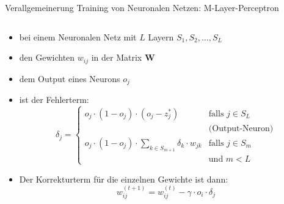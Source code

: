 \documentclass[aspectratio=1610, xcolor=dvipsnames, 9pt]{beamer}
\begin{document}
      \begin{frame}{ Verallgemeinerung Training von Neuronalen Netzen: M-Layer-Perceptron}
        \begin{columns}
          \begin{column}{1\textwidth}
            \begin{itemize}
              \item bei einem Neuronalen Netz mit $L$ Layern $S_1, S_2 , \ldots , S_L$
              \item den Gewichten $w_{ij}$ in der Matrix $\mathbf{W}$
              \item dem Output eines Neurons $o_j$
              \item ist der Fehlerterm: 
            \begin{equation*}
              \delta_j = \begin{cases} 
                o_j \cdot (1-o_j) \cdot (o_j - z_j^*) & \text{falls } j \in S_L \\
                & \text{(Output-Neuron)} \\[0.5em]
                o_j \cdot (1-o_j) \cdot \sum_{k \in S_{m+1}} \delta_k \cdot w_{jk} & \text{falls } j \in S_m \\
                & \text{und } m < L
              \end{cases}
            \end{equation*}
            \item Der Korrekturterm für die einzelnen Gewichte ist dann:
            \begin{equation}
              w_{ij}^{(t+1)} = w_{ij}^{(t)} - \gamma \cdot o_i \cdot \delta_j 
            \end{equation}
            \end{itemize}
          \end{column}
        \end{columns}
      \end{frame}
\end{document}
